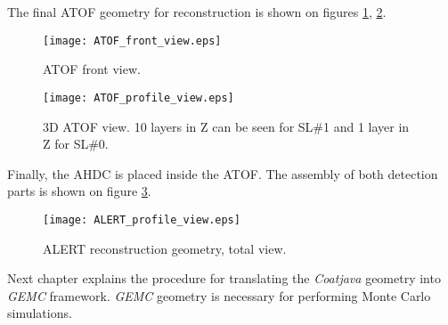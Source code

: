 The final ATOF geometry for reconstruction is shown on figures \ref{fig:atof_2}, \ref{fig:atof_3}.

\begin{figure}[H]
	\centering
	\texttt{[image: ATOF\_front\_view.eps]}
	\caption{ATOF front view.}
	\label{fig:atof_2}
\end{figure}
\begin{figure}[H]
	\centering
	\texttt{[image: ATOF\_profile\_view.eps]}
	\caption{3D ATOF view. 10 layers in Z can be seen for SL\#1 and 1 layer in Z for SL\#0.}
	\label{fig:atof_3}
\end{figure}

Finally, the AHDC is placed inside the ATOF. The assembly of both detection parts is shown on figure \ref{fig:alert_coatjava}.
\begin{figure}[H]
	\centering
	\texttt{[image: ALERT\_profile\_view.eps]}
	\caption{ALERT reconstruction geometry, total view.}
	\label{fig:alert_coatjava}
\end{figure}

Next chapter explains the procedure for translating the \textit{Coatjava} geometry into \textit{GEMC} framework. \textit{GEMC} geometry is necessary for performing Monte Carlo simulations.